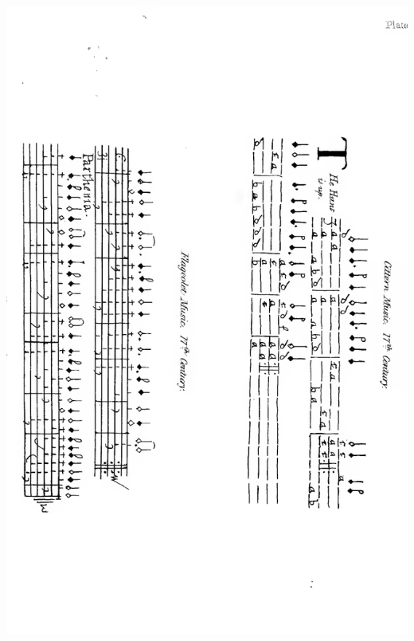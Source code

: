 \thispagestyle{empty}
\noindent\includegraphics*[width=\textwidth]{music/Plate5X.pdf}

\intentionalemptypage

\normalsize